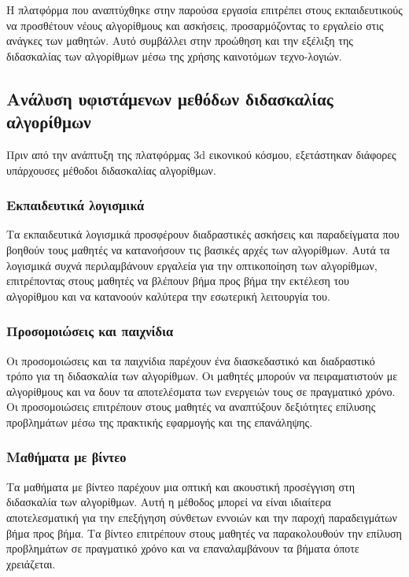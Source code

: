 Η πλατφόρμα που αναπτύχθηκε στην παρούσα εργασία επιτρέπει στους εκπαιδευτικούς να προσθέτουν νέους αλγορίθμους και ασκήσεις, προσαρμόζοντας το εργαλείο στις ανάγκες των μαθητών. Αυτό συμβάλλει στην προώθηση και την εξέλιξη της διδασκαλίας των αλγορίθμων μέσω της χρήσης καινοτόμων τεχνο-λογιών\cite{__2022}.


\subsection{Ανάλυση υφιστάμενων μεθόδων διδασκαλίας αλγορίθμων}

Πριν από την ανάπτυξη της πλατφόρμας \acrshort{3d} εικονικού κόσμου, εξετάστηκαν διάφορες υπάρχουσες μέθοδοι διδασκαλίας αλγορίθμων.

\subsubsection{Εκπαιδευτικά λογισμικά}

Τα εκπαιδευτικά λογισμικά προσφέρουν διαδραστικές ασκήσεις και παραδείγματα που βοηθούν τους μαθητές να κατανοήσουν τις βασικές αρχές των αλγορίθμων. Αυτά τα λογισμικά συχνά περιλαμβάνουν εργαλεία για την οπτικοποίηση των αλγορίθμων, επιτρέποντας στους μαθητές να βλέπουν βήμα προς βήμα την εκτέλεση του αλγορίθμου και να κατανοούν καλύτερα την εσωτερική λειτουργία του\cite{__2017}.

\subsubsection{Προσομοιώσεις και παιχνίδια}

Οι προσομοιώσεις και τα παιχνίδια παρέχουν ένα διασκεδαστικό και διαδραστικό τρόπο για τη διδασκαλία των αλγορίθμων. Οι μαθητές μπορούν να πειραματιστούν με αλγορίθμους και να δουν τα αποτελέσματα των ενεργειών τους σε πραγματικό χρόνο. Οι προσομοιώσεις επιτρέπουν στους μαθητές να αναπτύξουν δεξιότητες επίλυσης προβλημάτων μέσω της πρακτικής εφαρμογής και της επανάληψης\cite{crepinsek_note_2012}.

\subsubsection{Μαθήματα με βίντεο}

Τα μαθήματα με βίντεο παρέχουν μια οπτική και ακουστική προσέγγιση στη διδασκαλία των αλγορίθμων. Αυτή η μέθοδος μπορεί να είναι ιδιαίτερα αποτελεσματική για την επεξήγηση σύνθετων εννοιών και την παροχή παραδειγμάτων βήμα προς βήμα. Τα βίντεο επιτρέπουν στους μαθητές να παρακολουθούν την επίλυση προβλημάτων σε πραγματικό χρόνο και να επαναλαμβάνουν τα βήματα όποτε χρειάζεται\cite{__2022}.

